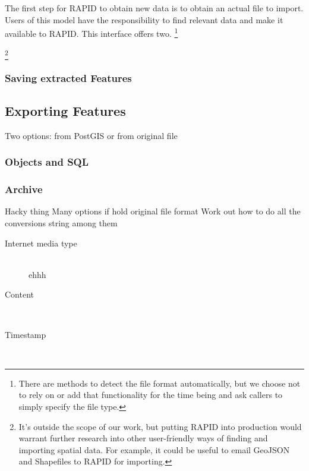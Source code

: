  The first step for RAPID to obtain new data is to obtain an actual file to import. Users of this model have the responsibility to find relevant data and make it available to RAPID. This interface offers two. 
 \footnote{There are methods to detect the file format automatically, but we choose not to rely on or add that functionality for the time being and ask callers to simply specify the file type.}
 
 \footnote{It's outside the scope of our work, but putting RAPID into production would warrant further research into other user-friendly ways of finding and importing spatial data. For example, it could be useful to email GeoJSON and Shapefiles to RAPID for importing.}
 
 \subsubsection{Saving extracted Features}



\subsection{Exporting Features}
Two options: from PostGIS or from original file
\subsubsection{Objects and SQL}
\subsubsection{Archive}

Hacky thing
Many options if hold original file format
Work out how to do all the conversions
string among them

\begin{description}
\item[Internet media type] \hfill \\
ehhh
\item[Content] \hfill \\
\item[Timestamp] \hfill \\
\end{description}





